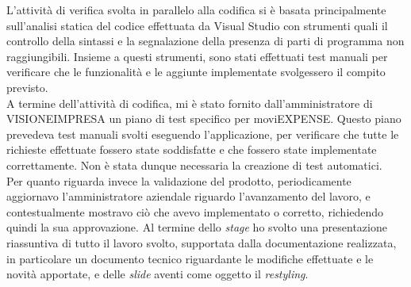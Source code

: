 L'attività di verifica svolta in parallelo alla codifica si è basata principalmente sull'analisi statica del codice effettuata da Visual Studio con strumenti quali il controllo della sintassi e la segnalazione della presenza di parti di programma non raggiungibili. Insieme a questi strumenti, sono stati effettuati test manuali per verificare che le funzionalità e le aggiunte implementate svolgessero il compito previsto.\\
A termine dell'attività di codifica, mi è stato fornito dall'amministratore di VISIONEIMPRESA un piano di test specifico per moviEXPENSE. Questo piano prevedeva test manuali svolti eseguendo l'applicazione, per verificare che tutte le richieste effettuate fossero state soddisfatte e che fossero state implementate correttamente. Non è stata dunque necessaria la creazione di test automatici.\\
Per quanto riguarda invece la validazione del prodotto, periodicamente aggiornavo l'amministratore aziendale riguardo l'avanzamento del lavoro, e contestualmente mostravo ciò che avevo implementato o corretto, richiedendo quindi la sua approvazione. Al termine dello \textit{stage} ho svolto una presentazione riassuntiva di tutto il lavoro svolto, supportata dalla documentazione realizzata, in particolare un documento tecnico riguardante le modifiche effettuate e le novità apportate, e delle \textit{slide} aventi come oggetto il \textit{restyling}.
